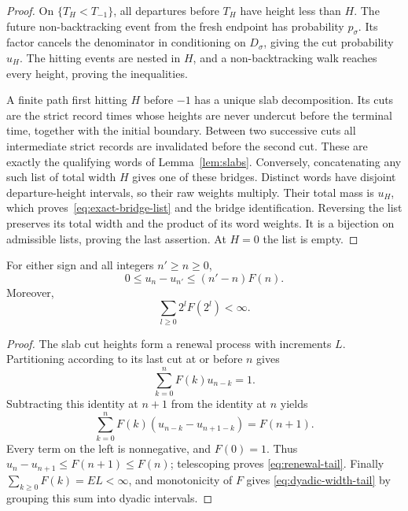 \begin{proof}
On $\{T_H<T_{-1}\}$, all departures before $T_H$ have height less
than $H$.  The future non-backtracking event from the fresh endpoint
has probability $p_\sigma$.  Its factor cancels the denominator
in conditioning on $D_\sigma$, giving the cut probability $u_H$.
The hitting events are nested in $H$, and a non-backtracking walk
reaches every height, proving the inequalities.

A finite path first hitting $H$ before $-1$ has a unique slab
decomposition.  Its cuts are the strict record times whose heights
are never undercut before the terminal time, together with the
initial boundary.  Between two successive cuts all intermediate
strict records are invalidated before the second cut.  These are
exactly the qualifying words of Lemma~\ref{lem:slabs}.
Conversely, concatenating any such list of total width $H$ gives
one of these bridges.  Distinct words have disjoint departure-height
intervals, so their raw weights multiply.  Their total mass is
$u_H$, which proves~\eqref{eq:exact-bridge-list} and the bridge
identification.  Reversing the list preserves its total width and
the product of its word weights.  It is a bijection on admissible
lists, proving the last assertion.  At $H=0$ the list is empty.
\end{proof}

\begin{lemma}\label{lem:renewal-tail}
For either sign and all integers $n'\ge n\ge0$,
\begin{equation}\label{eq:renewal-tail}
 0\le u_n-u_{n'}\le(n'-n)F(n).
\end{equation}
Moreover,
\begin{equation}\label{eq:dyadic-width-tail}
 \sum_{l\ge0}2^lF(2^l)<\infty.
\end{equation}
\end{lemma}

\begin{proof}
The slab cut heights form a renewal process with increments $L$.
Partitioning according to its last cut at or before $n$ gives
\[
 \sum_{k=0}^n F(k)u_{n-k}=1.
\]
Subtracting this identity at $n+1$ from the identity at $n$ yields
\[
 \sum_{k=0}^n F(k)(u_{n-k}-u_{n+1-k})=F(n+1).
\]
Every term on the left is nonnegative, and $F(0)=1$.
Thus $u_n-u_{n+1}\le F(n+1)\le F(n)$; telescoping proves
\eqref{eq:renewal-tail}.  Finally
$\sum_{k\ge0}F(k)=EL<\infty$, and monotonicity of $F$ gives
\eqref{eq:dyadic-width-tail} by grouping this sum into dyadic
intervals.
\end{proof}


